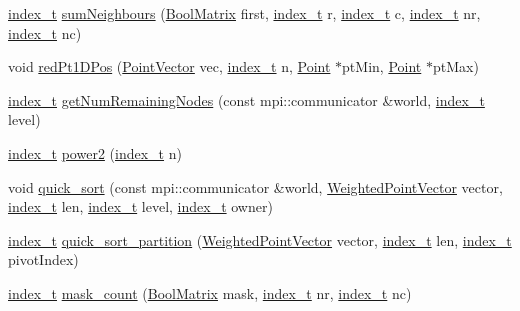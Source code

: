 \begin{CompactItemize}
\item 
\hyperlink{cowichan_8hpp_5b04577d5d21124855deaad298595371}{index\_\-t} \hyperlink{namespacecowichan__mpi_c244baae47084737f2274a270a24ad46}{sumNeighbours} (\hyperlink{cowichan_8hpp_a64c8df2f1e9c8ea68a7bcc19aca683e}{BoolMatrix} first, \hyperlink{cowichan_8hpp_5b04577d5d21124855deaad298595371}{index\_\-t} r, \hyperlink{cowichan_8hpp_5b04577d5d21124855deaad298595371}{index\_\-t} c, \hyperlink{cowichan_8hpp_5b04577d5d21124855deaad298595371}{index\_\-t} nr, \hyperlink{cowichan_8hpp_5b04577d5d21124855deaad298595371}{index\_\-t} nc)
\item 
void \hyperlink{namespacecowichan__mpi_4dabc70bacdff24786cbd9fff3227457}{redPt1DPos} (\hyperlink{class_point}{PointVector} vec, \hyperlink{cowichan_8hpp_5b04577d5d21124855deaad298595371}{index\_\-t} n, \hyperlink{class_point}{Point} $\ast$ptMin, \hyperlink{class_point}{Point} $\ast$ptMax)
\item 
\hyperlink{cowichan_8hpp_5b04577d5d21124855deaad298595371}{index\_\-t} \hyperlink{namespacecowichan__mpi_7f82c459ad086060228b2bd8100bf9c7}{getNumRemainingNodes} (const mpi::communicator \&world, \hyperlink{cowichan_8hpp_5b04577d5d21124855deaad298595371}{index\_\-t} level)
\item 
\hyperlink{cowichan_8hpp_5b04577d5d21124855deaad298595371}{index\_\-t} \hyperlink{namespacecowichan__mpi_a7c14e0bec9c9da1d56a348c9a0cf1f8}{power2} (\hyperlink{cowichan_8hpp_5b04577d5d21124855deaad298595371}{index\_\-t} n)
\item 
void \hyperlink{namespacecowichan__mpi_4ab537d0df99e9011b206c7259e82d35}{quick\_\-sort} (const mpi::communicator \&world, \hyperlink{class_weighted_point}{WeightedPointVector} vector, \hyperlink{cowichan_8hpp_5b04577d5d21124855deaad298595371}{index\_\-t} len, \hyperlink{cowichan_8hpp_5b04577d5d21124855deaad298595371}{index\_\-t} level, \hyperlink{cowichan_8hpp_5b04577d5d21124855deaad298595371}{index\_\-t} owner)
\item 
\hyperlink{cowichan_8hpp_5b04577d5d21124855deaad298595371}{index\_\-t} \hyperlink{namespacecowichan__mpi_83904b95f448398ff15331182ee0c007}{quick\_\-sort\_\-partition} (\hyperlink{class_weighted_point}{WeightedPointVector} vector, \hyperlink{cowichan_8hpp_5b04577d5d21124855deaad298595371}{index\_\-t} len, \hyperlink{cowichan_8hpp_5b04577d5d21124855deaad298595371}{index\_\-t} pivotIndex)
\item 
\hyperlink{cowichan_8hpp_5b04577d5d21124855deaad298595371}{index\_\-t} \hyperlink{namespacecowichan__mpi_a54004a105356573d4bac92e1b234aa2}{mask\_\-count} (\hyperlink{cowichan_8hpp_a64c8df2f1e9c8ea68a7bcc19aca683e}{BoolMatrix} mask, \hyperlink{cowichan_8hpp_5b04577d5d21124855deaad298595371}{index\_\-t} nr, \hyperlink{cowichan_8hpp_5b04577d5d21124855deaad298595371}{index\_\-t} nc)
\end{CompactItemize}


